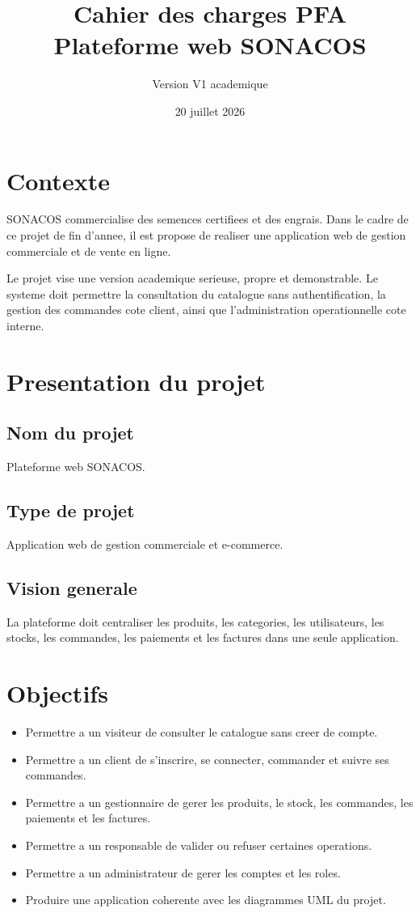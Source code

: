 \documentclass[12pt,a4paper]{article}
\title{Cahier des charges PFA\\Plateforme web SONACOS}
\author{Version V1 academique}
\date{20 juillet 2026}
\begin{document}
\maketitle
\tableofcontents
\newpage

\section{Contexte}
SONACOS commercialise des semences certifiees et des engrais. Dans le cadre de ce projet de fin d'annee, il est propose de realiser une application web de gestion commerciale et de vente en ligne.

Le projet vise une version academique serieuse, propre et demonstrable. Le systeme doit permettre la consultation du catalogue sans authentification, la gestion des commandes cote client, ainsi que l'administration operationnelle cote interne.

\section{Presentation du projet}

\subsection{Nom du projet}
Plateforme web SONACOS.

\subsection{Type de projet}
Application web de gestion commerciale et e-commerce.

\subsection{Vision generale}
La plateforme doit centraliser les produits, les categories, les utilisateurs, les stocks, les commandes, les paiements et les factures dans une seule application.

\section{Objectifs}
\begin{itemize}
  \item Permettre a un visiteur de consulter le catalogue sans creer de compte.
  \item Permettre a un client de s'inscrire, se connecter, commander et suivre ses commandes.
  \item Permettre a un gestionnaire de gerer les produits, le stock, les commandes, les paiements et les factures.
  \item Permettre a un responsable de valider ou refuser certaines operations.
  \item Permettre a un administrateur de gerer les comptes et les roles.
  \item Produire une application coherente avec les diagrammes UML du projet.
\end{itemize}
\end{document}
